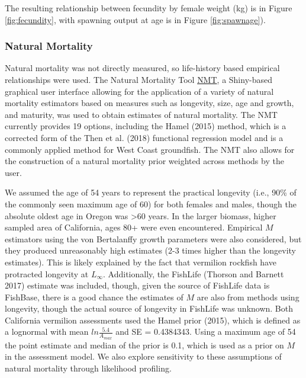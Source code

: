 \documentclass[
  english,
  a4paper,
]{article}
\begin{document}
The resulting relationship between fecundity by female weight (kg) is in Figure \ref{fig:fecundity}, with spawning output at age is in Figure \ref{fig:spawnage}).

\hypertarget{natural-mortality}{%
\subsubsection{Natural Mortality}\label{natural-mortality}}

Natural mortality was not directly measured, so life-history based empirical
relationships were used. The Natural Mortality Tool
\href{https://github.com/shcaba/Natural-Mortality-Tool}{NMT}, a Shiny-based
graphical user interface allowing for the application of a variety of natural
mortality estimators based on measures such as longevity, size, age and growth,
and maturity, was used to obtain estimates of natural mortality. The NMT currently
provides 19 options, including the Hamel (2015) method, which is a corrected
form of the Then et al. (2018) functional regression model and is a commonly
applied method for West Coast groundfish. The NMT also allows for the construction
of a natural mortality prior weighted across methods by the user.

We assumed the age of 54 years to represent the practical longevity (i.e., 90\% of
the commonly seen maximum age of 60) for both females and males, though the absolute
oldest age in Oregon was \textgreater60 years. In the larger biomass, higher sampled area of
California, ages 80+ were even encountered. Empirical \(M\) estimators using the von
Bertalanffy growth parameters were also considered, but they produced unreasonably
high estimates (2-3 times higher than the longevity estimates). This is likely
explained by the fact that vermilion rockfish have protracted longevity at \(L_{\infty}\).
Additionally, the FishLife (Thorson and Barnett 2017) estimate was included, though, given
the source of FishLife data is FishBase, there is a good chance the estimates of
\(M\) are also from methods using longevity, though the actual source of longevity
in FishLife was unknown.
Both California vermilion assessments used the Hamel prior (2015), which
is defined as a lognormal with mean \(ln\frac{5.4}{A_{max}}\) and SE = 0.4384343.
Using a maximum age of 54 the point estimate and median of the prior is 0.1, which
is used as a prior on \(M\) in the assessment model. We also explore sensitivity to
these assumptions of natural mortality through likelihood profiling.
\end{document}
